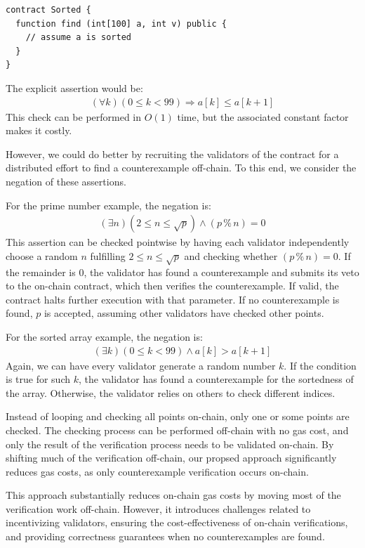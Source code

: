 \documentclass[runningheads]{llncs}
\begin{document}
\begin{lstlisting}[numbers=none]
contract Sorted {
  function find (int[100] a, int v) public {
    // assume a is sorted
  }
}
\end{lstlisting}
The explicit assertion would be:
\begin{gather*}\label{}
  (\forall k) (0\leq k <99) \Rightarrow a[k] \leq a[k+1]
\end{gather*}
This check can be performed in \(O(1)\) time, but the associated constant factor makes it costly.

However, we could do better by recruiting the validators of the contract for a distributed effort to find a counterexample off-chain. To this end, we consider the negation of these assertions. 

For the prime number example, the negation is:
\begin{gather*}\label{}
  (\exists n) (2 \leq n \leq \sqrt{p}) \wedge (p \mathbin{\%} n) = 0
\end{gather*}
This assertion can be checked pointwise by having each validator independently choose a random \(n\) fulfilling \(2 \leq n \leq \sqrt{p}\) and checking whether \((p \mathbin{\%} n) = 0\). If the remainder is \(0\), the validator has found a counterexample and submits its veto to the on-chain contract, which then verifies the counterexample. If valid, the contract halts further execution with that parameter. If no counterexample is found, \(p\) is accepted, assuming other validators have checked other points.

For the sorted array example, the negation is:
\begin{gather*}\label{}
  (\exists k) (0\leq k <99) \wedge a[k] > a[k+1]
\end{gather*}
Again, we can have every validator generate a random number \(k\). If the condition is true for such \(k\), the validator has found a counterexample for the sortedness of the array. Otherwise, the validator relies on others to check different indices.

Instead of looping and checking all points on-chain, only one or some points are checked. The checking process can be performed off-chain with no gas cost, and only the result of the verification process needs to be validated on-chain. By shifting much of the verification off-chain, our propsed approach significantly reduces gas costs, as only counterexample verification occurs on-chain.

This approach substantially reduces on-chain gas costs by moving most of the verification work off-chain. However, it introduces challenges related to incentivizing validators, ensuring the cost-effectiveness of on-chain verifications, and providing correctness guarantees when no counterexamples are found.
\end{document}
